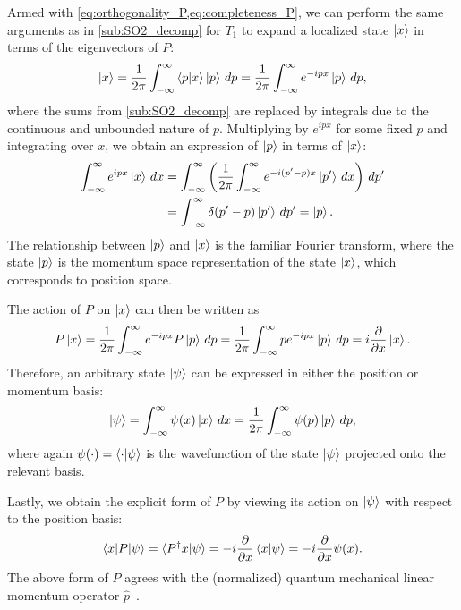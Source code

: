 Armed with \cref{eq:orthogonality_P,eq:completeness_P}, we can perform the same arguments as in \cref{sub:SO2_decomp} for $T_1$ to expand a localized state $\ket{x}$ in terms of the eigenvectors of $P$:
\begin{align*}
    \ket{x} = \frac{1}{2\pi}\int_{-\infty}^{\infty} \braket{p|x}\ket{p} \,dp = \frac{1}{2\pi}\int_{-\infty}^{\infty} e^{-ipx}\ket{p} \,dp,
\end{align*}
where the sums from \cref{sub:SO2_decomp} are replaced by integrals due to the continuous and unbounded nature of $p$. Multiplying by $e^{ipx}$ for some fixed $p$ and integrating over $x$, we obtain an expression of $\ket{p}$ in terms of $\ket{x}$:
\begin{align*}
    \int_{-\infty}^{\infty} e^{ipx}\ket{x} \,dx
        &= \int_{-\infty}^{\infty} \left(\frac{1}{2\pi} \int_{-\infty}^{\infty} e^{-i(p'-p)x}\ket{p'} \,dx \right)\,dp' \\
        &= \int_{-\infty}^{\infty} \delta(p'-p) \ket{p'} \,dp' = \ket{p}.
\end{align*}
The relationship between $\ket{p}$ and $\ket{x}$ is the familiar Fourier transform, where the state $\ket{p}$ is the momentum space representation of the state $\ket{x}$, which corresponds to position space.

The action of $P$ on $\ket{x}$ can then be written as
\begin{align*}
    P\ket{x} = \frac{1}{2\pi}\int_{-\infty}^{\infty} e^{-ipx}P\ket{p} \,dp = \frac{1}{2\pi}\int_{-\infty}^{\infty} p e^{-ipx}\ket{p} \,dp = i\frac{\partial}{\partial x}\ket{x}.
\end{align*}
Therefore, an arbitrary state $\ket{\psi}$ can be expressed in either the position or momentum basis:
\begin{align*}
    \ket{\psi} = \int_{-\infty}^{\infty} \psi(x)\ket{x} \,dx = \frac{1}{2\pi}\int_{-\infty}^{\infty} \psi(p)\ket{p} \,dp,
\end{align*}
where again $\psi(\cdot) = \braket{\cdot|\psi}$ is the wavefunction of the state $\ket{\psi}$ projected onto the relevant basis.

Lastly, we obtain the explicit form of $P$ by viewing its action on $\ket{\psi}$ with respect to the position basis:
\begin{align*}
    \braket{x|P|\psi} = \braket{P^\dagger x|\psi} = -i\frac{\partial}{\partial x}\braket{x|\psi} = -i\frac{\partial}{\partial x}\psi(x).
\end{align*}
The above form of $P$ agrees with the (normalized) quantum mechanical linear momentum operator $\hat{p}$~\cite{Hall2013,Griffiths2018}.

